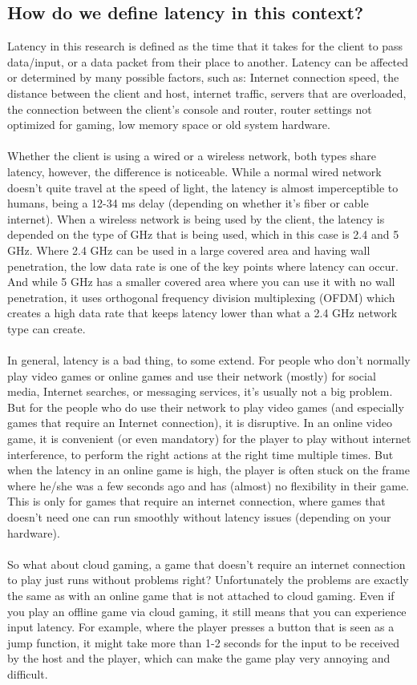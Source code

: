 \subsection{How do we define latency in this context?}
Latency in this research is defined as the time that it takes for the client to pass data/input, or a data packet from their place to another. Latency can be affected or determined by many possible factors, such as: Internet connection speed, the distance between the client and host, internet traffic, servers that are overloaded, the connection between the client's console and router, router settings not optimized for gaming, low memory space or old system hardware.\\\\
Whether the client is using a wired or a wireless network, both types share latency, however, the difference is noticeable. While a normal wired network doesn't quite travel at the speed of light, the latency is almost imperceptible to humans, being a 12-34 ms delay (depending on whether it's fiber or cable internet). When a wireless network is being used by the client, the latency is depended on the type of GHz that is being used, which in this case is 2.4 and 5 GHz. Where 2.4 GHz can be used in a large covered area and having wall penetration, the low data rate is one of the key points where latency can occur. And while 5 GHz has a smaller covered area where you can use it with no wall penetration, it uses orthogonal frequency division multiplexing (OFDM) which creates a high data rate that keeps latency lower than what a 2.4 GHz network type can create.\\\\
In general, latency is a bad thing, to some extend. For people who don't normally play video games or online games and use their network (mostly) for social media, Internet searches, or messaging services, it's usually not a big problem. But for the people who do use their network to play video games (and especially games that require an Internet connection), it is disruptive. In an online video game, it is convenient (or even mandatory) for the player to play without internet interference, to perform the right actions at the right time multiple times. But when the latency in an online game is high, the player is often stuck on the frame where he/she was a few seconds ago and has (almost) no flexibility in their game. This is only for games that require an internet connection, where games that doesn't need one can run smoothly without latency issues (depending on your hardware).\\\\
So what about cloud gaming, a game that doesn't require an internet connection to play just runs without problems right? Unfortunately the problems are exactly the same as with an online game that is not attached to cloud gaming. Even if you play an offline game via cloud gaming, it still means that you can experience input latency. For example, where the player presses a button that is seen as a jump function, it might take more than 1-2 seconds for the input to be received by the host and the player, which can make the game play very annoying and difficult.
